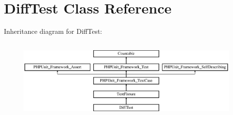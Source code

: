 \section{Diff\+Test Class Reference}
\label{class_diff_test}
Inheritance diagram for Diff\+Test\+:\begin{figure}[H]
\begin{center}
\leavevmode
\includegraphics[height=4.129793cm]{class_diff_test}
\end{center}
\end{figure}
